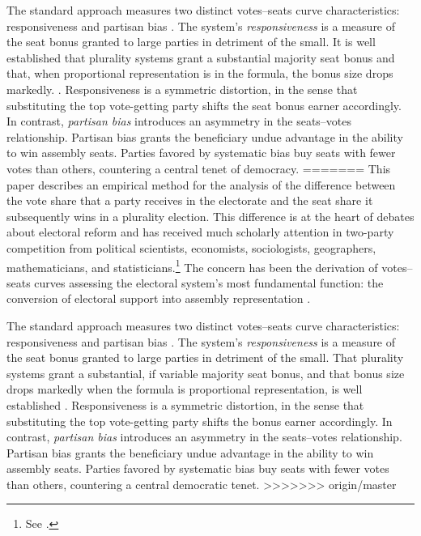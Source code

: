 \documentclass[letter,12pt]{article}
\begin{document}
The standard approach measures two distinct votes--seats curve characteristics: responsiveness and partisan bias \citep{tufte1973seatsVotes,king.browning1987biasRespUS}. The system's \emph{responsiveness} is a measure of the seat bonus granted to large parties in detriment of the small. It is well established that plurality systems grant a substantial majority seat bonus and that, when proportional representation is in the formula, the bonus size drops markedly. \citep{taagepera.shugart.1989,linzerSeatVoteElasticity2012}. Responsiveness is a symmetric distortion, in the sense that substituting the top vote-getting party shifts the seat bonus earner accordingly. In contrast, \emph{partisan bias} introduces an asymmetry in the seats--votes relationship. Partisan bias grants the beneficiary undue advantage in the ability to win assembly seats. Parties favored by systematic bias buy seats with fewer votes than others, countering a central tenet of democracy. 
=======
\noindent This paper describes an empirical method for the analysis of the difference between the vote share that a party receives in the electorate and the seat share it subsequently wins in a plurality election. This difference is at the heart of debates about electoral reform and has received much scholarly attention in two-party competition from political scientists, economists, sociologists, geographers, mathematicians, and statisticians.\footnote{See \citet{altman.mcdonald2011bard,balinskiYoung2001FairRep,brady.grofmanBiasResponsiveness1991,cain.partisanRedistricting.1985,cox.katz.2002,engstrom2006redisttrictApsr,erikson1972malapportionment,gelman.king.1994EvalElSysRedis,grofmanBiasProportionality.1983,grofman.etalBiasMalapp.1997,gudgin.taylor.1980decomposeBias,johnston.2002,kendall.stuartCubeLaw1950,king.browning1987biasRespUS,niemi.fett1986swing,rae.1967,rossiter.etal.1997,taagepera.CubeLaw.1973,trelles.mtz.polygob2012,tufte1973seatsVotes}.\label{fn:cites}} The concern has been the derivation of votes--seats curves assessing the electoral system's most fundamental function: the conversion of electoral support into assembly representation \citep{lijphartElSysPtySys.1994}. 

The standard approach measures two distinct votes--seats curve characteristics: responsiveness and partisan bias \citep{tufte1973seatsVotes,king.browning1987biasRespUS}. The system's \emph{responsiveness} is a measure of the seat bonus granted to large parties in detriment of the small. That plurality systems grant a substantial, if variable majority seat bonus, and that bonus size drops markedly when the formula is proportional representation, is well established \citep{taagepera.shugart.1989,linzerSeatVoteElasticity2012}. Responsiveness is a symmetric distortion, in the sense that substituting the top vote-getting party shifts the bonus earner accordingly. In contrast, \emph{partisan bias} introduces an asymmetry in the seats--votes relationship. Partisan bias grants the beneficiary undue advantage in the ability to win assembly seats. Parties favored by systematic bias buy seats with fewer votes than others, countering a central democratic tenet.
>>>>>>> origin/master
\end{document}
